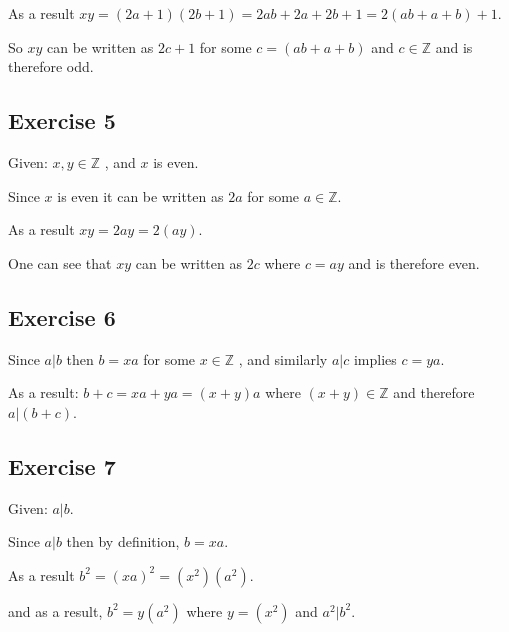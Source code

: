 \documentclass[a4paper]{article}
\begin{document}
As a result $xy = (2a+1)(2b+1) = 2ab + 2a + 2b + 1 = 2(ab+a+b)+1$.

So $xy$ can be written as $2c+1$ for some $c=(ab+a+b)$ and $c \in \mathbb{Z}$
and is therefore odd.

\subsection{Exercise 5}

Given: $ x, y \in \mathbb{Z} $ , and $x$ is even.

Since $x$ is even it can be written as $2a$ for some $a \in \mathbb{Z}$.

As a result $xy = 2ay = 2(ay)$.

One can see that $xy$ can be written as $2c$ where $c = ay$ and is therefore
even.

\subsection{Exercise 6}

Since $a | b$ then $b = xa$ for some $x \in \mathbb{Z}$ , and similarly $a | c$
implies $c = ya$.

As a result: $b+c = xa + ya = (x+y)a$ where $ (x+y) \in \mathbb{Z}$ and
therefore $a|(b+c)$.

\subsection{Exercise 7}

Given: $a | b$.

Since $a | b$ then by definition, $b = xa$.

As a result $b^2 = (xa)^2 = (x^2)(a^2)$.

and as a result, $b^2 = y(a^2)$ where $y=(x^2)$ and $a^2|b^2$.
\end{document}

